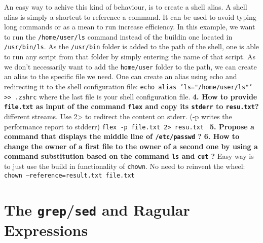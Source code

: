 \documentclass[a4paper,oneside,onecolumn]{article}
\newcommand{\code}[1]{\colorbox{codegray}{\texttt{#1}}}
\begin{document}
\newline
\newline
An easy way to achive this kind of behaviour, is to create a shell alias. A shell alias is simply a shortcut to reference a command. It can be used to avoid typing long commands or as a mean to run increase efficiency.
In this example, we want to run the \texttt{/home/user/ls} command instead of the buildin one located in \texttt{/usr/bin/ls}. As the \texttt{/usr/bin} folder is added to the path of the shell, one is able to run any script from that folder by simply entering the name of that script.
\newline
As we don't necessarily want to add the \texttt{home/user} folder to the path, we can create an alias to the specific file we need. 
\newline
\newline
One can create an alias using echo and redirecting it to the shell configuration file: 
\newline
\code{echo alias 'ls="/home/user/ls"' >> .zshrc} where the last file is your shell configuration file.
\newline
\newline
\noindent
\textbf{4. How to provide \texttt{file.txt} as input of the command \code{flex} and copy its \texttt{stderr} to \texttt{resu.txt}?}
\newline
{} different streams. Use 2> to redirect the content on stderr. (-p writes the performance report to stdderr)
\newline
\code{flex -p file.txt 2> resu.txt }
\newline
\newline
\noindent
\textbf{5. Propose a command that displays the middle line of \texttt{/etc/passwd} ?}
\newline
\newline
\newline
\newline
\noindent
\textbf{6. How to change the owner of a first file to the owner of a second one by using a command substitution based on the command \code{ls} and \code{cut} ?}
\newline
\newline
Easy way is to just use the build in functionality of \code{chown}. No need to reinvent the wheel:
\newline
\code{chown --reference=result.txt file.txt}

\section*{The \code{grep}/\code{sed} and Ragular Expressions}
\end{document}
